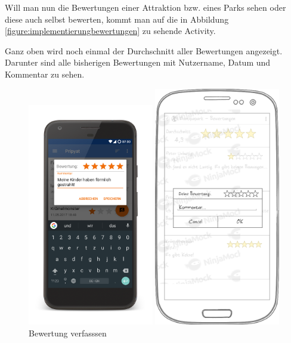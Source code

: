 Will man nun die Bewertungen einer Attraktion bzw. eines Parks sehen oder diese auch selbst bewerten, kommt man auf die in Abbildung \ref{figure:implementierungbewertungen} zu sehende Activity. 

Ganz oben wird noch einmal der Durchschnitt aller Bewertungen angezeigt. Darunter sind alle bisherigen Bewertungen mit Nutzername, Datum und Kommentar zu sehen.

\begin{figure}[h]
    \centering
    \begin{minipage}{0.49\textwidth}
        \centering
        \includegraphics[width=0.49\textwidth, trim=150 200 200 200, 
        clip]{img/screenshots/ss_bewertung_edit.png}
        \caption{Bewertung verfasssen}
		\label{figure:implementierungbewerten}
    \end{minipage}
    \begin{minipage}{0.49\textwidth}
        \centering
        \includegraphics[width=0.49\textwidth]{img/mockups/m_bewertung_verfassen.png}

\end{minipage}
\end{figure}
